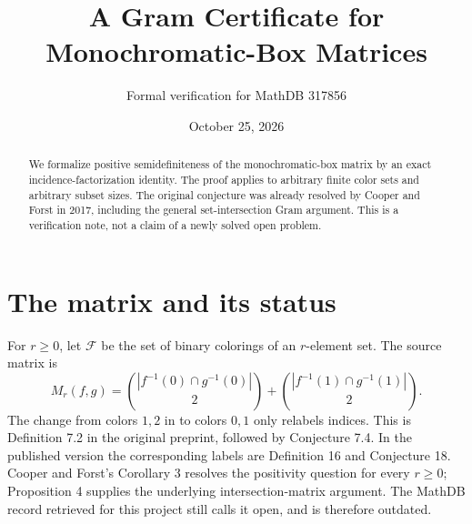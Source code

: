 \documentclass[11pt]{article}
\title{A Gram Certificate for Monochromatic-Box Matrices}
\author{Formal verification for MathDB 317856}
\date{October 25, 2026}
\begin{document}
\maketitle
\begin{abstract}
We formalize positive semidefiniteness of the monochromatic-box matrix by an exact incidence-factorization identity. The proof applies to arbitrary finite color sets and arbitrary subset sizes. The original conjecture was already resolved by Cooper and Forst in 2017, including the general set-intersection Gram argument. This is a verification note, not a claim of a newly solved open problem.
\end{abstract}
\section{The matrix and its status}
For $r\ge0$, let $\mathcal F$ be the set of binary colorings of an $r$-element set. The source matrix is
\[
M_r(f,g)=\binom{|f^{-1}(0)\cap g^{-1}(0)|}{2}
 +\binom{|f^{-1}(1)\cap g^{-1}(1)|}{2}.
\]
The change from colors $1,2$ in \cite{CFP} to colors $0,1$ only relabels indices. This is Definition 7.2 in the original preprint, followed by Conjecture 7.4. In the published version the corresponding labels are Definition 16 and Conjecture 18. Cooper and Forst's Corollary 3 \cite{CF} resolves the positivity question for every $r\ge0$; Proposition 4 supplies the underlying intersection-matrix argument. The MathDB record retrieved for this project still calls it open, and is therefore outdated.
\end{document}
